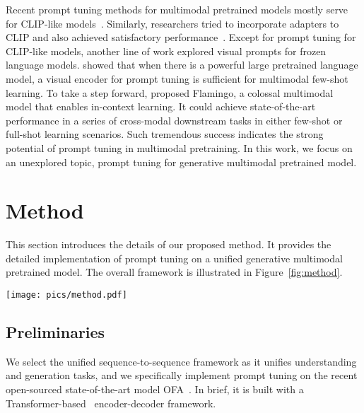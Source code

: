 \documentclass[11pt]{article}
\begin{document}
Recent prompt tuning methods for multimodal pretrained models mostly serve for CLIP-like models~\citep{coop, cocoop, denseclip}. Similarly, researchers tried to incorporate adapters to CLIP and also achieved satisfactory performance~\citep{clip_adapter, tip_adapter}. 
Except for prompt tuning for CLIP-like models, another line of work explored visual prompts for frozen language models. 
\citet{frozen} showed that when there is a powerful large pretrained language model, a visual encoder for prompt tuning is sufficient for multimodal few-shot learning. 
To take a step forward, \citet{flamingo} proposed Flamingo, a colossal multimodal model that enables in-context learning. 
It could achieve state-of-the-art performance in a series of cross-modal downstream tasks in either few-shot or full-shot learning scenarios. 
Such tremendous success indicates the strong potential of prompt tuning in multimodal pretraining. 
In this work, we focus on an unexplored topic, prompt tuning for generative multimodal pretrained model. 





 
\section{Method}

This section introduces the details of our proposed method. It provides the detailed implementation of prompt tuning on a unified generative multimodal pretrained model. The overall framework is illustrated in Figure~\ref{fig:method}. 

\begin{figure*}[t]
    \centering
    \texttt{[image: pics/method.pdf]}
    \caption{\textbf{Model overview. }An illustration of our multimodal prompt tuning architecture. Specifically, for the encoder and decoder, we add tunable prompt embeddings to each layer. }
    \label{fig:method}
\end{figure*}




\subsection{Preliminaries}

We select the unified sequence-to-sequence framework as it unifies understanding and generation tasks, and we specifically implement prompt tuning on the recent open-sourced state-of-the-art model OFA~\citep{ofa}.
In brief, it is built with a Transformer-based~\citep{transformer} encoder-decoder framework. 
\end{document}
